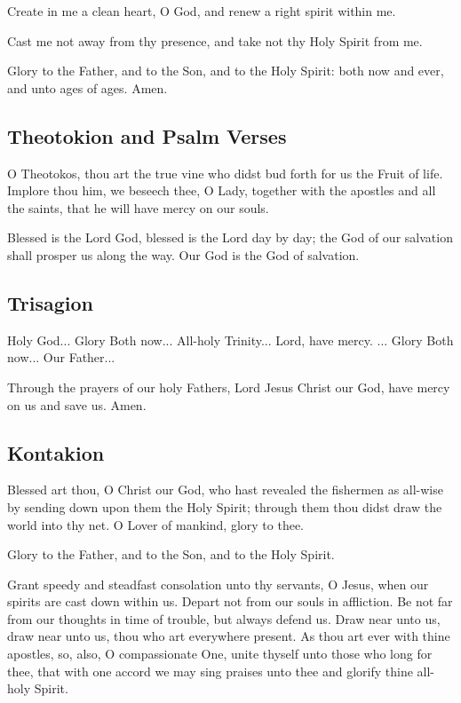 Create in me a clean heart, O God, and renew a right spirit within me. 

 Cast me not away from thy presence, and take not thy Holy Spirit from me. 

Glory to the Father, and to the Son, and to the Holy Spirit: both now and ever, and unto ages of ages. Amen.

\subsection{Theotokion and Psalm Verses}

O Theotokos, thou art the true vine who didst bud forth for us the Fruit of life. Implore thou him, we beseech thee, O Lady, together with the apostles and all the saints, that he will have mercy on our souls.

Blessed is the Lord God, blessed is the Lord day by day; the God of our salvation shall prosper us along the way. Our God is the God of salvation.

\subsection{Trisagion}

Holy God... Glory  Both now... All-holy Trinity... Lord, have mercy. ... Glory  Both now... Our Father...

Through the prayers of our holy Fathers, Lord Jesus Christ our God, have mercy on us and save us. Amen.

\subsection{Kontakion}


Blessed art thou, O Christ our God, who hast revealed the fishermen as all-wise by sending down upon them the Holy Spirit; through them thou didst draw the world into thy net. O Lover of mankind, glory to thee.

Glory to the Father, and to the Son, and to the Holy Spirit.

Grant speedy and steadfast consolation unto thy servants, O Jesus, when our spirits are cast down within us. Depart not from our souls in affliction. Be not far from our thoughts in time of trouble, but always defend us. Draw near unto us, draw near unto us, thou who art everywhere present. As thou art ever with thine apostles, so, also, O compassionate One, unite thyself unto those who long for thee, that with one accord we may sing praises unto thee and glorify thine all-holy Spirit.


